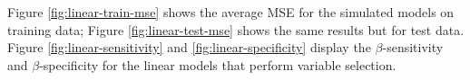 \documentclass{article}
\begin{document}

	
	Figure \ref{fig:linear-train-mse} shows the average MSE for the simulated models on training data; Figure \ref{fig:linear-test-mse} shows the same results but for test data. Figure \ref{fig:linear-sensitivity} and \ref{fig:linear-specificity} display the $\beta$-sensitivity and $\beta$-specificity for the linear models that perform variable selection.
	
\end{document}
